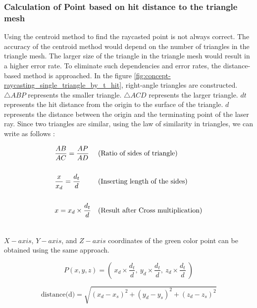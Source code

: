 \subsubsection{Calculation of Point based on hit distance to the triangle mesh}
Using the centroid method to find the raycasted point is not always correct. The accuracy of the centroid method would depend on the number of triangles in the triangle mesh. The larger size of the triangle in the triangle mesh would result in a higher error rate. To eliminate such dependencies and error rates, the distance-based method is approached.  
In the figure \ref{fig:concept-raycasting_single_triangle_by_t_hit}, right-angle triangles are constructed. $\triangle ABP$ represents the smaller triangle. $\triangle ACD$ represents the larger triangle. \(dt\) represents the hit distance from the origin to the surface of the triangle. \(d\) represents the distance between the origin and the terminating point of the laser ray. Since two triangles are similar, using the law of similarity in triangles, we can write as follows : 

\begin{gather*}
\begin{aligned}
&\frac{AB}{AC} = \frac{AP}{AD} && \text{(Ratio of sides of triangle)}\hfill \\ \\
&\frac{x}{x_d} = \frac{d_t}{d} && \text{(Inserting length of the sides)}\hfill \\  \\
&x = x_d \times \frac{d_t}{d} && \text{(Result after Cross multiplication)}\hfill  \\  \\
\end{aligned}
\end{gather*}

\(X-axis\), \(Y-axis\), and \(Z-axis\) coordinates of the green color point can be obtained using the same approach.

\begin{equation}\label{eq:find_xyz}
    P(x, y, z) = \left( \: x_d \times \frac{d_t}{d}, \: y_d \times \frac{d_t}{d}, \: z_d \times \frac{d_t}{d} \: \right)
\end{equation}

\begin{equation}\label{eq:distance}
\text{distance(d)} = \sqrt{{(x_d - x_s)}^2 + {(y_d - y_s)}^2 + {(z_d - z_s)}^2}
\end{equation}

